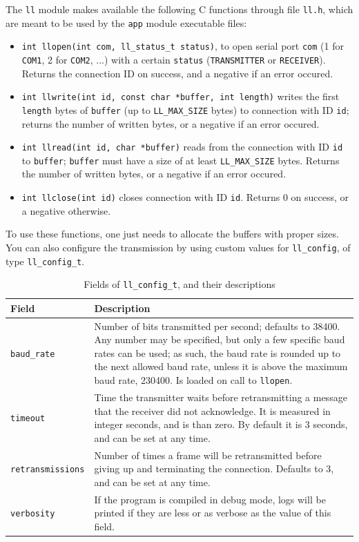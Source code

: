 \documentclass[a4paper, 11pt]{report}
\begin{document}
The \texttt{ll} module makes available the following C functions through file \texttt{ll.h}, which are meant to be used by the \texttt{app} module executable files:
\begin{itemize}
	\itemsep0em
	\item \texttt{int llopen(int com, ll\_status\_t status)}, to open serial port \texttt{com} (1 for \texttt{COM1}, 2 for \texttt{COM2}, ...) with a certain \texttt{status} (\texttt{TRANSMITTER} or \texttt{RECEIVER}). Returns the connection ID on success, and a negative if an error occured.
	\item \texttt{int llwrite(int id, const char *buffer, int length)} writes the first \texttt{length} bytes of \texttt{buffer} (up to \texttt{LL\_MAX\_SIZE} bytes) to connection with ID \texttt{id}; returns the number of written bytes, or a negative if an error occured.
	\item \texttt{int llread(int id, char *buffer)} reads from the connection with ID \texttt{id} to \texttt{buffer}; \texttt{buffer} must have a size of at least \texttt{LL\_MAX\_SIZE} bytes. Returns the number of written bytes, or a negative if an error occured.
	\item \texttt{int llclose(int id)} closes connection with ID \texttt{id}. Returns 0 on success, or a negative otherwise.
\end{itemize}

To use these functions, one just needs to allocate the buffers with proper sizes. You can also configure the transmission by using custom values for \texttt{ll\_config}, of type \texttt{ll\_config\_t}.

\begin{table}[H]
	\centering
	\begin{tabular}{l | p{12cm}}
		\hline \hline
		\textbf{Field}           & \textbf{Description} \\ \hline
		\texttt{baud\_rate}      & Number of bits transmitted per second; defaults to 38400. Any number may be specified, but only a few specific baud rates can be used; as such, the baud rate is rounded up to the next allowed baud rate, unless it is above the maximum baud rate, 230400. Is loaded on call to \texttt{llopen}. \\ \hline
		\texttt{timeout}         & Time the transmitter waits before retransmitting a message that the receiver did not acknowledge. It is measured in integer seconds, and is than zero. By default it is 3 seconds, and can be set at any time. \\ \hline
		\texttt{retransmissions} & Number of times a frame will be retransmitted before giving up and terminating the connection. Defaults to 3, and can be set at any time. \\ \hline
		\texttt{verbosity}       & If the program is compiled in debug mode, logs will be printed if they are less or as verbose as the value of this field.\\ \hline \hline
	\end{tabular}
	\caption{Fields of \texttt{ll\_config\_t}, and their descriptions}
\end{table}
\end{document}

